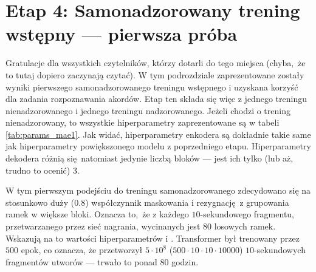 \section{Etap 4: Samonadzorowany trening wstępny --- pierwsza próba}

Gratulacje dla wszystkich czytelników, którzy dotarli do tego miejsca (chyba, że to tutaj dopiero zaczynają czytać). W tym podrozdziale zaprezentowane zostały wyniki pierwszego samonadzorowanego treningu wstępnego i uzyskana korzyść dla zadania rozpoznawania akordów. Etap ten składa się więc z jednego treningu nienadzorowanego i jednego treningu nadzorowanego. Jeżeli chodzi o trening nienadzorowany, to wszystkie hiperparametry zaprezentowane są w tabeli \ref{tab:params_mae1}. Jak widać, hiperparametry enkodera są dokładnie takie same jak hiperparametry powiększonego modelu z poprzedniego etapu. Hiperparametry dekodera różnią się natomiast jedynie liczbą bloków --- jest ich tylko (lub aż, trudno to ocenić) $3$. 

W tym pierwszym podejściu do treningu samonadzorowanego zdecydowano się na stosunkowo duży ($0.8$) współczynnik maskowania i rezygnację z grupowania ramek w większe bloki. Oznacza to, że z każdego $10$-sekundowego fragmentu, przetwarzanego przez sieć nagrania, wycinanych jest $80$ losowych ramek. Wskazują na to wartości hiperparametrów   i . Transformer był trenowany przez $500$ epok, co oznacza, że przetworzył $5 \cdot 10^8$ ($500 \cdot 10 \cdot 10 \cdot 10000$) $10$-sekundowych fragmentów utworów --- trwało to ponad $80$ godzin.

